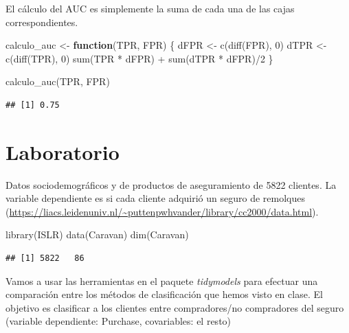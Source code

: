 \documentclass[
  12pt,
]{book}
\newenvironment{Shaded}{\begin{snugshade}}{\end{snugshade}}
\newcommand{\ControlFlowTok}[1]{\textcolor[rgb]{0.13,0.29,0.53}{\textbf{#1}}}
\newcommand{\DecValTok}[1]{\textcolor[rgb]{0.00,0.00,0.81}{#1}}
\newcommand{\FunctionTok}[1]{\textcolor[rgb]{0.00,0.00,0.00}{#1}}
\newcommand{\NormalTok}[1]{#1}
\newcommand{\OtherTok}[1]{\textcolor[rgb]{0.56,0.35,0.01}{#1}}
\newcommand{\SpecialCharTok}[1]{\textcolor[rgb]{0.00,0.00,0.00}{#1}}
\begin{document}
El cálculo del AUC es simplemente la suma de cada una de las cajas
correspondientes.

\begin{Shaded}
\begin{Highlighting}[]
\NormalTok{calculo\_auc }\OtherTok{\textless{}{-}} \ControlFlowTok{function}\NormalTok{(TPR, FPR) \{}
\NormalTok{    dFPR }\OtherTok{\textless{}{-}} \FunctionTok{c}\NormalTok{(}\FunctionTok{diff}\NormalTok{(FPR), }\DecValTok{0}\NormalTok{)}
\NormalTok{    dTPR }\OtherTok{\textless{}{-}} \FunctionTok{c}\NormalTok{(}\FunctionTok{diff}\NormalTok{(TPR), }\DecValTok{0}\NormalTok{)}
    \FunctionTok{sum}\NormalTok{(TPR }\SpecialCharTok{*}\NormalTok{ dFPR) }\SpecialCharTok{+} \FunctionTok{sum}\NormalTok{(dTPR }\SpecialCharTok{*}\NormalTok{ dFPR)}\SpecialCharTok{/}\DecValTok{2}
\NormalTok{\}}

\FunctionTok{calculo\_auc}\NormalTok{(TPR, FPR)}
\end{Highlighting}
\end{Shaded}

\begin{verbatim}
## [1] 0.75
\end{verbatim}

\hypertarget{laboratorio-7}{%
\section{Laboratorio}\label{laboratorio-7}}

Datos sociodemográficos y de productos de aseguramiento de 5822
clientes. La variable dependiente es si cada cliente adquirió un seguro
de remolques
(\url{https://liacs.leidenuniv.nl/~puttenpwhvander/library/cc2000/data.html}).

\begin{Shaded}
\begin{Highlighting}[]
\FunctionTok{library}\NormalTok{(ISLR)}
\FunctionTok{data}\NormalTok{(Caravan)}
\FunctionTok{dim}\NormalTok{(Caravan)}
\end{Highlighting}
\end{Shaded}

\begin{verbatim}
## [1] 5822   86
\end{verbatim}

Vamos a usar las herramientas en el paquete \emph{tidymodels} para
efectuar una comparación entre los métodos de clasificación que hemos
visto en clase. El objetivo es clasificar a los clientes entre
compradores/no compradores del seguro (variable dependiente: Purchase,
covariables: el resto)
\end{document}
